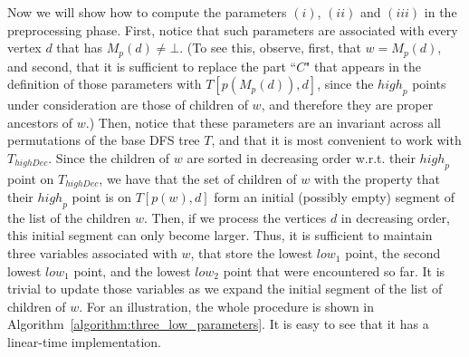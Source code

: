 \documentclass[11pt,a4paper]{article}
\begin{document}
Now we will show how to compute the parameters $(i)$, $(ii)$ and $(iii)$ in the preprocessing phase. First, notice that such parameters are associated with every vertex $d$ that has $M_p(d)\neq\bot$. (To see this, observe, first, that $w=M_p(d)$, and second, that it is sufficient to replace the part ``$C$" that appears in the definition of those parameters with $T[p(M_p(d)),d]$, since the $\mathit{high}_p$ points under consideration are those of children of $w$, and therefore they are proper ancestors of $w$.) Then, notice that these parameters are an invariant across all permutations of the base DFS tree $T$, and that it is most convenient to work with $T_\mathit{highDec}$. Since the children of $w$ are sorted in decreasing order w.r.t. their $\mathit{high}_p$ point on $T_\mathit{highDec}$, we have that the set of children of $w$ with the property that their $\mathit{high}_p$ point is on $T[p(w),d]$ form an initial (possibly empty) segment of the list of the children $w$. Then, if we process the vertices $d$ in decreasing order, this initial segment can only become larger. Thus, it is sufficient to maintain three variables associated with $w$, that store the lowest $\mathit{low}_1$ point, the second lowest $\mathit{low}_1$ point, and the lowest $\mathit{low}_2$ point that were encountered so far. It is trivial to update those variables as we expand the initial segment of the list of children of $w$. For an illustration, the whole procedure is shown in Algorithm~\ref{algorithm:three_low_parameters}. It is easy to see that it has a linear-time implementation.  
\end{document}
